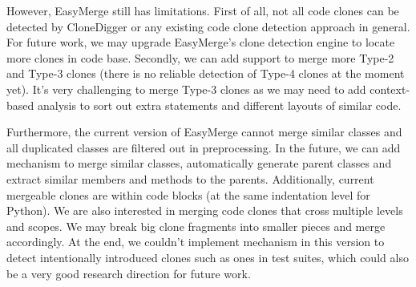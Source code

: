 \documentclass{acm_proc_article-sp}
\begin{document}
However, EasyMerge still has limitations. First of all, not all code clones can be detected by CloneDigger or any existing
code clone detection approach in general. For future work, we may upgrade EasyMerge's clone detection engine to locate
more clones in code base. Secondly, we can add support to merge more Type-2 and Type-3 clones (there is no reliable detection of Type-4 clones at the moment yet).
It's very challenging to merge Type-3 clones as we may need to add context-based analysis to sort out extra statements and different layouts of similar code.

Furthermore, the current version of EasyMerge cannot merge similar classes and all duplicated classes are filtered out in preprocessing.
In the future, we can add mechanism to merge similar classes, automatically generate parent classes and extract similar members and methods to the parents.
Additionally, current mergeable clones are within code blocks (at the same indentation level for Python). We are also interested in merging code clones that cross
multiple levels and scopes. We may break big clone fragments into smaller pieces and merge accordingly.
At the end, we couldn't implement mechanism in this version to detect intentionally introduced clones such as ones in test suites, which could 
also be a very good research direction for future work.



%

%
%
\end{document}
